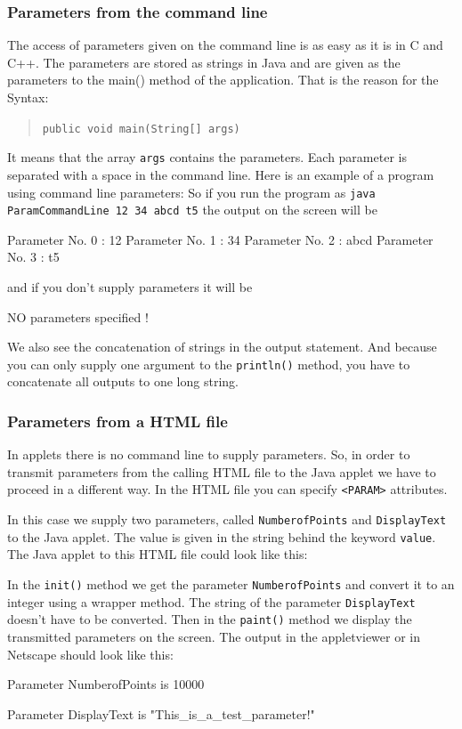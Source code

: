 \subsubsection{Parameters from the command line}
The access of parameters given on the command line is as easy as it
is in C and C++. The parameters are stored as strings in Java and
are given as the parameters to the main() method of the application.
That is the reason for the Syntax:
\begin{quotation}
  \verb|public void main(String[] args) |
\end{quotation}
It means that the array \verb|args| contains the parameters. Each parameter
is separated with a space in the command line. Here is an example of a 
program using command line parameters:
So if you run the program as \verb|java ParamCommandLine 12 34 abcd t5|
the output on the screen will be
\begin{sverbatim}
 Parameter No. 0 : 12
 Parameter No. 1 : 34
 Parameter No. 2 : abcd
 Parameter No. 3 : t5
\end{sverbatim}
and if you don't supply parameters it will be
\begin{sverbatim}
 NO parameters specified !
\end{sverbatim}
We also see the concatenation of strings in the output statement.
And because you can only supply one argument to the  \verb|println()|
method, you have to concatenate all outputs to one long string.

\subsubsection{Parameters from a HTML file}
In applets there is no command line to supply parameters. 
So, in order to transmit 
parameters from the calling HTML file to the Java applet we have to
proceed in a different way.
In the HTML file you can
specify \verb|<PARAM>| attributes.

In this case we supply two parameters, called \verb|NumberofPoints| and
\verb|DisplayText| to the Java applet. The value is given in the string
behind the keyword \verb|value|. The Java applet to this HTML file
could look like this:

In the \verb|init()| method we get the parameter \verb|NumberofPoints|
and convert it to an integer using a wrapper method. The string 
of the parameter \verb|DisplayText| doesn't have
to be converted. Then in the \verb|paint()| method we display
the transmitted parameters on the screen. The output in the 
appletviewer or in Netscape should look like this:
\begin{sverbatim}
  Parameter NumberofPoints is 10000

  Parameter DisplayText is "This_is_a_test_parameter!"
\end{sverbatim}


